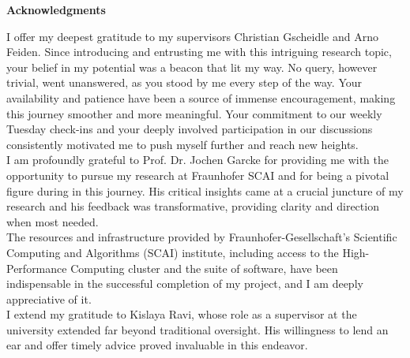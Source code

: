 \clearemptydoublepage
{}
{}

\vspace*{2cm}

\begin{center}
{\Large \textbf{Acknowledgments}}
\end{center}

\vspace{1cm}

I offer my deepest gratitude to my supervisors Christian Gscheidle and Arno Feiden. Since introducing and entrusting me with this intriguing research topic, your belief in my potential was a beacon that lit my way. No query, however trivial, went unanswered, as you stood by me every step of the way. Your availability and patience have been a source of immense encouragement, making this journey smoother and more meaningful. Your commitment to our weekly Tuesday check-ins and your deeply involved participation in our discussions consistently motivated me to push myself further and reach new heights. \\

I am profoundly grateful to Prof. Dr. Jochen Garcke for providing me with the opportunity to pursue my research at Fraunhofer SCAI and for being a pivotal figure during in this journey. His critical insights came at a crucial juncture of my research and his feedback was transformative, providing clarity and direction when most needed. \\

The resources and infrastructure provided by Fraunhofer-Gesellschaft's Scientific Computing and Algorithms (SCAI) institute, including access to the High-Performance Computing cluster and the suite of software, have been indispensable in the successful completion of my project, and I am deeply appreciative of it. \\

I extend my gratitude to Kislaya Ravi, whose role as a supervisor at the university extended far beyond traditional oversight. His willingness to lend an ear and offer timely advice proved invaluable in this endeavor. \\

